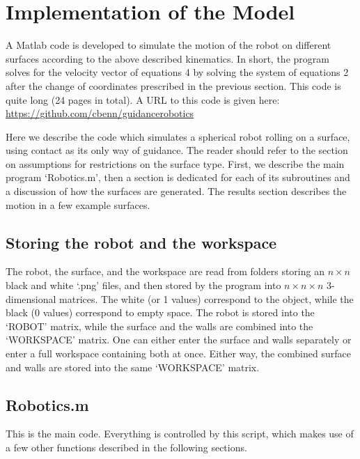 \documentclass[journal]{IEEEtran}
\begin{document}
\section{Implementation of the Model}
A Matlab code is developed to simulate the motion of the robot on different surfaces according to the above described kinematics. In short, the program solves for the velocity vector of equations 4 by solving the system of equations 2 after the change of coordinates prescribed in the previous section. This code is quite long (24 pages in total). A URL to this code is given here: 
\url{https://github.com/cbenn/guidancerobotics}

Here we describe the code which simulates a spherical robot rolling on a surface, using contact as its only way of guidance. The reader should refer to the section on assumptions for restrictions on the surface type. First, we describe the main program `Robotics.m', then a section is dedicated for each of its subroutines and a discussion of how the surfaces are generated. The results section describes the motion in a few example surfaces. 

\subsection{Storing the robot and the workspace}
The robot, the surface, and the workspace are read from folders storing an $n \times n$ black and white `.png' files, and then stored by the program into $n\times n\times n$ 3-dimensional matrices. The white (or 1 values) correspond to the object, while the black (0 values) correspond to empty space. The robot is stored into the `ROBOT' matrix, while the surface and the walls are combined into the `WORKSPACE' matrix. One can either enter the surface and walls separately or enter a full workspace containing both at once. Either way, the combined surface and walls are stored into the same `WORKSPACE' matrix.

\subsection{Robotics.m}
This is the main code. Everything is controlled by this script, which makes use of a few other functions described in the following sections.
\end{document}
